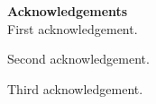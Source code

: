 \setlength{\parskip}{1em}
\thispagestyle{empty}
\noindent
{\huge \textbf{Acknowledgements}}
\\[1\baselineskip]
\noindent
First acknowledgement.

\noindent
Second acknowledgement.

\noindent
Third acknowledgement.

\setlength{\parskip}{0.3em}